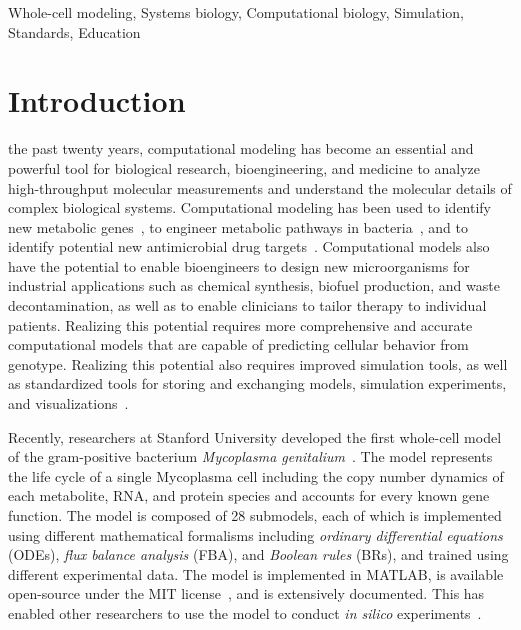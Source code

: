 \documentclass[journal,transmag]{IEEEtran}
\begin{document}
\begin{IEEEkeywords}
Whole-cell modeling, Systems biology, Computational biology, Simulation, Standards, Education
\end{IEEEkeywords}

\IEEEpeerreviewmaketitle

\section{Introduction}

 the past twenty years, computational modeling has become an essential and powerful tool for biological research, bioengineering, and medicine to analyze high-throughput molecular measurements and understand the molecular details of complex biological systems. Computational modeling has been used to identify new metabolic genes~\cite{Reed2006}, to engineer metabolic pathways in bacteria~\cite{Lee2012}, and to identify potential new antimicrobial drug targets~\cite{Lee2009}.
Computational models also have the potential to enable bioengineers to design new microorganisms for industrial applications such as chemical synthesis, biofuel production, and waste decontamination, as well as to enable clinicians to tailor therapy to individual patients. Realizing this potential requires more comprehensive and accurate computational models that are capable of predicting cellular behavior from genotype. Realizing this potential also requires improved simulation tools, as well as standardized tools for storing and exchanging models, simulation experiments, and visualizations~\cite{Macklin2014,Karr2015,Karr2015b,hucka2015promoting,Klipp07,path2models2013}.

Recently, researchers at Stanford University developed the first whole-cell model of the gram-positive bacterium \textit{Mycoplasma genitalium}~\cite{Karr2012}. The model represents the life cycle of a single Mycoplasma cell including the copy number dynamics of each metabolite, RNA, and protein species and accounts for every known gene function. The model is composed of 28 submodels, each of which is implemented using different mathematical formalisms including \emph{ordinary differential equations} (ODEs), \emph{flux balance analysis} (FBA), and \emph{Boolean rules} (BRs), and trained using different experimental data. 
The model is implemented in MATLAB, is available open-source under the MIT license~\cite{wholeCell}, and is extensively documented. This has enabled other researchers to use the model to conduct \textit{in silico} experiments~\cite{Sanghvi2013, Purcell2013, Kazakiewicz2015}. 
\end{document}
